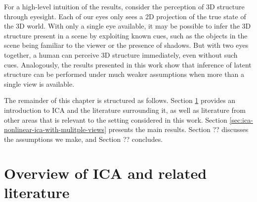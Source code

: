 For a high-level intuition of the results, consider the perception of 3D structure through eyesight.
Each of our eyes only sees a 2D projection of the true state of the 3D world.
With only a single eye available, it may be possible to infer the 3D structure present in a scene by exploiting known cues, such as the objects in the scene being familiar to the viewer or the presence of shadows.
But with two eyes together, a human can perceive 3D structure immediately, even without such cues. 
Analogously, the results presented in this work show that inference of latent structure can be performed under much weaker assumptions when more than a single view is available.


The remainder of this chapter is structured as follows.
Section \ref{sec:ica-literature-overview} provides an introduction to ICA and the literature surrounding it, as well as literature from other areas that is relevant to the setting considered in this work.
Section \ref{sec:ica-nonlinear-ica-with-mulitple-views} presents the main results.
Section ?? discusses the assumptions we make, and Section ?? concludes.




\section{Overview of ICA and related literature}\label{sec:ica-literature-overview}

